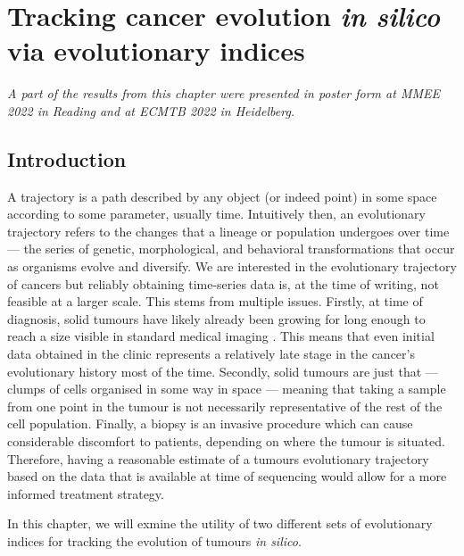 \chapter{Tracking cancer evolution \textit{in silico} via evolutionary indices}
\textit{A part of the results from this chapter were presented in poster form at MMEE 2022 in Reading and at ECMTB 2022 in Heidelberg.}

\section{Introduction}
A trajectory is a path described by any object (or indeed point) in some space according to some parameter, usually time.  Intuitively then, an evolutionary trajectory refers to the changes that a lineage or population undergoes over time --- the series of genetic, morphological, and behavioral transformations that occur as organisms evolve and diversify. We are interested in the evolutionary trajectory of cancers but reliably obtaining time-series data is, at the time of writing, not feasible at a larger scale. This stems from multiple issues. Firstly, at time of diagnosis, solid tumours have likely already been growing for long enough to reach a size visible in standard medical imaging \cite{patrone_how_2011}. This means that even initial data obtained in the clinic represents a relatively late stage in the cancer's evolutionary history most of the time. Secondly, solid tumours are just that --- clumps of cells organised in some way in space --- meaning that taking a sample from one point in the tumour is not necessarily representative of the rest of the cell population. Finally, a biopsy is an invasive procedure which can cause considerable discomfort to patients, depending on where the tumour is situated. Therefore, having a reasonable estimate of a tumours evolutionary trajectory based on the data that is available at time of sequencing would allow for a more informed treatment strategy.\par
In this chapter, we will exmine the utility of two different sets of evolutionary indices for tracking the evolution of tumours \textit{in silico}.

